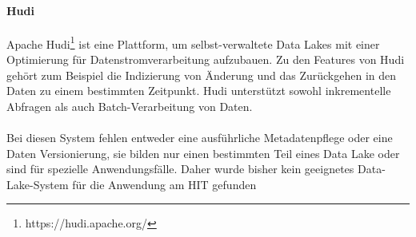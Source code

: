 \paragraph{Hudi} Apache Hudi\footnote{https://hudi.apache.org/} ist eine Plattform, um selbst-verwaltete Data Lakes mit einer Optimierung für Datenstromverarbeitung aufzubauen.
Zu den Features von Hudi gehört zum Beispiel die Indizierung von Änderung und das Zurückgehen in den Daten zu einem bestimmten Zeitpunkt.
Hudi unterstützt sowohl inkrementelle Abfragen als auch Batch-Verarbeitung von Daten.

\paragraph{}
Bei diesen System fehlen entweder eine ausführliche Metadatenpflege oder eine Daten Versionierung, sie bilden nur einen bestimmten Teil eines Data Lake oder sind für spezielle Anwendungsfälle.
Daher wurde bisher kein geeignetes Data-Lake-System für die Anwendung am HIT gefunden


